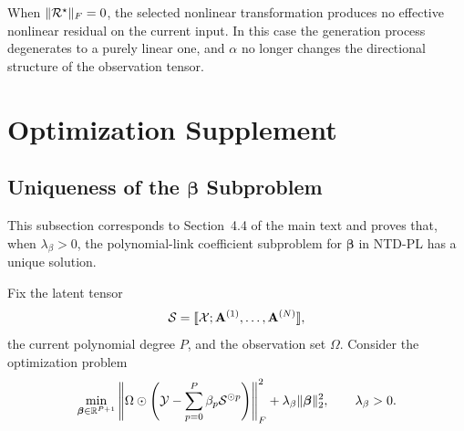 \begin{remark}
When $\|\mathcal{R}^\star\|_F=0$, the selected nonlinear transformation produces no effective nonlinear residual on the current input. In this case the generation process degenerates to a purely linear one, and $\alpha$ no longer changes the directional structure of the observation tensor.
\end{remark}

\section{Optimization Supplement}

\subsection{\texorpdfstring{Uniqueness of the $\boldsymbol\beta$ Subproblem}{Uniqueness of the beta Subproblem}}
\label{app:beta_unique}

This subsection corresponds to Section~4.4 of the main text and proves that, when $\lambda_\beta>0$, the polynomial-link coefficient subproblem for $\boldsymbol\beta$ in NTD-PL has a unique solution.

Fix the latent tensor
\begin{equation}
\mathcal{S}=\llbracket \mathcal{X};\mathbf A^{(1)},\dots,\mathbf A^{(N)}\rrbracket,
\end{equation}
the current polynomial degree $P$, and the observation set $\Omega$. Consider the optimization problem
\begin{equation}
\min_{\boldsymbol\beta\in\mathbb R^{P+1}}
\left\|
\Omega\odot
\left(
\mathcal{Y}-\sum_{p=0}^{P}\beta_p \mathcal{S}^{\odot p}
\right)
\right\|_F^2
+
\lambda_\beta\|\boldsymbol\beta\|_2^2,
\qquad \lambda_\beta>0.
\label{eq:beta_subproblem_app}
\end{equation}

